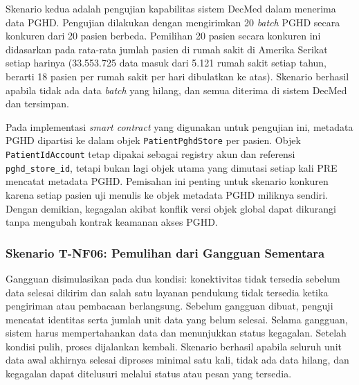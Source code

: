 Skenario kedua adalah pengujian kapabilitas sistem DecMed dalam menerima data PGHD\@.
Pengujian dilakukan dengan mengirimkan 20 \textit{batch} PGHD secara konkuren dari 20 pasien berbeda.
Pemilihan 20 pasien secara konkuren ini didasarkan pada rata-rata jumlah pasien di rumah sakit di Amerika Serikat setiap harinya (33.553.725 data masuk dari 5.121 rumah sakit setiap tahun, berarti 18 pasien per rumah sakit per hari dibulatkan ke atas).
Skenario berhasil apabila tidak ada data \textit{batch} yang hilang, dan semua diterima di sistem DecMed dan tersimpan.

Pada implementasi \textit{smart contract} yang digunakan untuk pengujian ini, metadata PGHD dipartisi ke dalam objek \texttt{PatientPghdStore} per pasien.
Objek \texttt{PatientIdAccount} tetap dipakai sebagai registry akun dan referensi \texttt{pghd\_store\_id}, tetapi bukan lagi objek utama yang dimutasi setiap kali PRE mencatat metadata PGHD\@.
Pemisahan ini penting untuk skenario konkuren karena setiap pasien uji menulis ke objek metadata PGHD miliknya sendiri.
Dengan demikian, kegagalan akibat konflik versi objek global dapat dikurangi tanpa mengubah kontrak keamanan akses PGHD\@.



\subsubsection{Skenario T-NF06: Pemulihan dari Gangguan Sementara}

Gangguan disimulasikan pada dua kondisi: konektivitas tidak tersedia sebelum data selesai dikirim dan salah satu layanan pendukung tidak tersedia ketika pengiriman atau pembacaan berlangsung.
Sebelum gangguan dibuat, penguji mencatat identitas serta jumlah unit data yang belum selesai.
Selama gangguan, sistem harus mempertahankan data dan menunjukkan status kegagalan.
Setelah kondisi pulih, proses dijalankan kembali.
Skenario berhasil apabila seluruh unit data awal akhirnya selesai diproses minimal satu kali, tidak ada data hilang, dan kegagalan dapat ditelusuri melalui status atau pesan yang tersedia.


